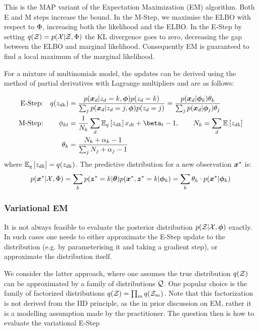 This is the MAP variant of the Expectation Maximization (EM) algorithm\cite{Dempster1977}. 
Both E and M steps increase the bound. In the M-Step, we maximise the ELBO with respect to $\params$, increasing both the likelihood and the ELBO. In the E-Step by setting $q(\zdat) = p(\xdat|\zdat, \params)$ the KL divergence goes to zero, decreasing the gap between the ELBO and marginal likelihood. Consequently EM is guaranteed to find a local maximum of the marginal likelihood.

For a mixture of multinomials model, the updates can be derived using the method of partial derivatives with Lagrange multipliers and are as follows:

\begin{align}
\text{E-Step:} & & q(z_{dk}) 
& = \frac{p(\xd|z_d = k, \param)p(z_d = k)}{\sum_j p(\xd|z_d = j, \param)p(z_d = j)} 
= \frac{p(\xd | \param_k) \theta_k}{\sum_j p(\xd | \param_j) \theta_j} \label{eqn:mom-estep} \\
\text{M-Step:} 
& & \phi_{kt} & = \frac{1}{N_k} \sum_d \ex{z_{dk}}{q} x_{dt} + \beta_t - 1, \qquad N_k = \sum_d \ex{z_{dk}}{} \\
& & \theta_k & =  \frac{N_k + \alpha_k - 1}{\sum_j N_j + \alpha_j - 1} \label{eqn:mom-mstep}
\end{align}
where $\ex{z_{dk}}{q} = q(z_{dk})$. The predictive distribution for a new observation $\xnew$ is:
\begin{align}
p(\xnew | \xdat, \params)  = \sum_k p(\znew = k | \vv{\theta}) p(\xnew, \znew = k | \param_k) 
= \sum_k \theta_k \cdot p(\xnew | \param_k)
\end{align}


\subsubsection{Variational EM}
It is not always feasible to evaluate the posterior distribution $p(\zdat|\xdat, \param)$ exactly. In such cases one needs to either approximate the E-Step update to the distribution (e.g. by parameterising it and taking a gradient step), or approximate the distribution itself.

We consider the latter approach, where one assumes the true distribution $q(\zdat)$ can be approximated by a family of distributions $\qfam$. One popular choice is the family of factorized distributions $q(\zdat) = \prod_m q(\zdat_m)$. Note that this factorization is not derived from the IID principle, as the in prior discussion on EM, rather it is a modelling assumption made by the practitioner. The question then is how to evaluate the variational E-Step


